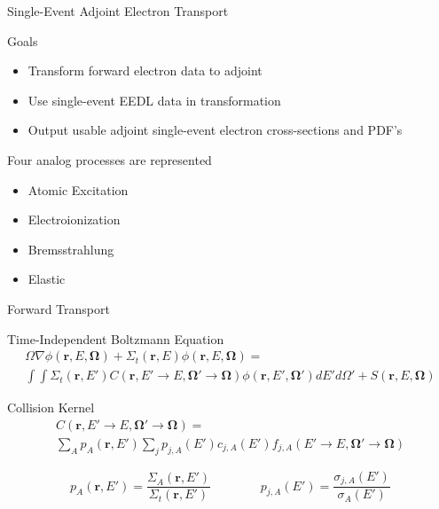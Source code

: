 \documentclass{beamer}
\begin{document}
\begin{frame}{Single-Event Adjoint Electron Transport}

\begin{block}{Goals}
	\begin{itemize}
	\item Transform forward electron data to adjoint
	\item Use single-event EEDL data in transformation
	\item Output usable adjoint single-event electron cross-sections and PDF's
	\end{itemize}

\end{block}

\begin{block}{Four analog processes are represented}

  \begin{itemize}
    \item Atomic Excitation
    \item Electroionization
    \item Bremsstrahlung
    \item Elastic
  \end{itemize}

\end{block}

\end{frame}
%
\begin{frame}{Forward Transport}
\begin{block}{Time-Independent Boltzmann Equation}
\begin{multline}
  \Omega \nabla \phi(\boldsymbol r,E,\boldsymbol\Omega) + 
  \Sigma_t(\boldsymbol{r},E)\phi(\boldsymbol{r},E,\boldsymbol{\Omega}) = \\
  \int\int\Sigma_t(\boldsymbol{r},E')C(\boldsymbol{r},E'\rightarrow E,\boldsymbol{\Omega'}\rightarrow\boldsymbol{\Omega})\phi(\boldsymbol{r},E',\boldsymbol{\Omega'})dE'd\Omega' + 
  S(\boldsymbol{r},E,\boldsymbol{\Omega})
\end{multline}
\end{block}

\begin{block}{Collision Kernel}
\begin{multline}
C(\boldsymbol{r},E'\rightarrow E,\boldsymbol{\Omega'}\rightarrow\boldsymbol{\Omega}) = \\
\sum_A p_A(\boldsymbol{r},E') \sum_j p_{j,A}(E') c_{j,A}(E') f_{j,A}(E'\rightarrow E,\boldsymbol{\Omega'}\rightarrow\boldsymbol{\Omega})
\end{multline}

\begin{equation}
p_A(\boldsymbol{r},E') = \frac{\Sigma_A(\boldsymbol{r},E')}{\Sigma_t(\boldsymbol{r},E')}
~~~~~~~~~~~~~~~~~~
p_{j,A}(E') = \frac{\sigma_{j,A}(E')}{\sigma_A(E')} \nonumber
\end{equation}

\end{block}

\end{frame}
\end{document}
